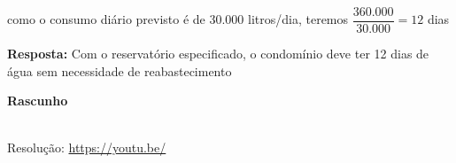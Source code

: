 como o consumo diário previsto é de 30.000 litros/dia, teremos $ \dfrac{360.000}{30.000} = 12 $ dias

\textbf{Resposta:} Com o reservatório especificado, o condomínio deve ter 12 dias de água sem necessidade de reabastecimento

\textbf{Rascunho}



\begin{center}
    \href{https://youtu.be/}{
    }\\
    Resolução: \url{https://youtu.be/}
\end{center}
